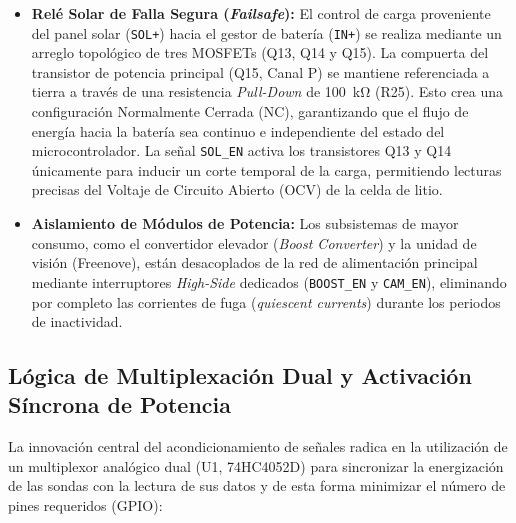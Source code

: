 \begin{itemize}
  \item \textbf{Relé Solar de Falla Segura (\textit{Failsafe}):} El control de carga proveniente del panel solar (\texttt{SOL+}) hacia el gestor de batería (\texttt{IN+}) se realiza mediante un arreglo topológico de tres MOSFETs (Q13, Q14 y Q15). La compuerta del transistor de potencia principal (Q15, Canal P) se mantiene referenciada a tierra a través de una resistencia \textit{Pull-Down} de \SI{100}{\kilo\ohm} (R25). Esto crea una configuración Normalmente Cerrada (NC), garantizando que el flujo de energía hacia la batería sea continuo e independiente del estado del microcontrolador. La señal \texttt{SOL\_EN} activa los transistores Q13 y Q14 únicamente para inducir un corte temporal de la carga, permitiendo lecturas precisas del Voltaje de Circuito Abierto (OCV) de la celda de litio.
  \item \textbf{Aislamiento de Módulos de Potencia:} Los subsistemas de mayor consumo, como el convertidor elevador (\textit{Boost Converter}) y la unidad de visión (Freenove), están desacoplados de la red de alimentación principal mediante interruptores \textit{High-Side} dedicados (\texttt{BOOST\_EN} y \texttt{CAM\_EN}), eliminando por completo las corrientes de fuga (\textit{quiescent currents}) durante los periodos de inactividad.
\end{itemize}

\subsection{Lógica de Multiplexación Dual y Activación Síncrona de Potencia}
\label{subsec:logica_multiplexacion_dual}

La innovación central del acondicionamiento de señales radica en la utilización de un multiplexor analógico dual (U1, 74HC4052D) para sincronizar la energización de las sondas con la lectura de sus datos y de esta forma minimizar el número de pines requeridos (GPIO):

